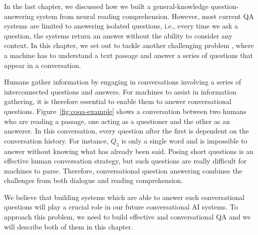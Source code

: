 

In the last chapter, we discussed how we built a general-knowledge question-answering system from neural reading comprehension. However, most current QA systems are limited to answering isolated questions, i.e., every time we ask a question, the systems return an answer without the ability to consider any context. In this chapter, we set out to tackle another challenging problem , where a machine has to understand a text passage and answer a series of questions that appear in a conversation.

Humans gather information by engaging in conversations involving a series of interconnected questions and answers. For machines to assist in information gathering, it is therefore essential to enable them to answer conversational questions. Figure~\ref{fig:coqa-example} shows a conversation between two humans who are reading a passage, one acting as a questioner and the other as an answerer. In this conversation, every question after the first is dependent on the conversation history. For instance, $Q_5$  is only a single word and is impossible to answer without knowing what has already been said. Posing short questions is an effective human conversation strategy, but such questions are really difficult for machines to parse. Therefore, conversational question answering combines the challenges from both dialogue and reading comprehension.

We believe that building systems which are able to answer such conversational questions will play a crucial role in our future conversational AI systems. To approach this problem, we need to build effective  and conversational QA  and we will describe both of them in this chapter.

